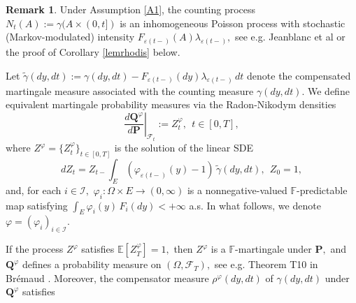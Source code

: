 \documentclass[11pt]{article}
\theoremstyle{plain}
\theoremstyle{definition}
\newtheorem{remark}[theorem]{Remark}
\numberwithin{equation}{section}
\newcommand{\calF}{\mathcal{F}}
\newcommand{\calI}{\mathcal{I}}
\newcommand{\eps}{\varepsilon}
\newcommand{\Exp}{\mathds{E}}
\newcommand{\Prob}{\mathbf{P}}
\newcommand{\Fil}{\mathds{F}}
\newcommand{\Qbf}{\mathbf{Q}}
\begin{document}
\begin{remark}
Under Assumption \ref{A1}, the counting process $N_t(A):=\gamma(A\times (0,t])$ is an inhomogeneous Poisson process with stochastic (Markov-modulated) intensity $F_{\eps(t-)}(A)\lambda_{\eps(t-)},$ see e.g. Jeanblanc et al \cite[Section 8.4.2]{jeanblanc} or the proof of Corollary \ref{lemrhodis} below.
\end{remark}
Let $\widetilde{\gamma}(dy,dt):=\gamma(dy,dt)- F_{\eps(t-)}(dy)\lambda_{\eps(t-)}\,dt$ denote the compensated martingale measure associated with the counting measure $\gamma(dy,dt).$ We define equivalent martingale probability measures via the Radon-Nikodym densities
\[
\left.\frac{d\Qbf^\varphi}{d\Prob}\right|_{\calF_t}:=Z_t^\varphi, \ \ t\in[0,T],
\]
where $Z^\varphi=\{Z_t^\varphi\}_{t\in[0,T]}$ is the solution of the linear SDE
\begin{equation}\label{eq:dZt}
dZ_t=Z_{t-}\int_{E}(\varphi_{\eps(t-)}(y)-1)\,\widetilde{\gamma}(dy,dt), \ \ Z_0=1,
\end{equation}
and, for each $i\in\calI,$ $\varphi_i:\Omega\times E\to (0,\infty)$ is a nonnegative-valued $\Fil$-predictable map satisfying $\int_E\varphi_{i}(y)\,F_{i}(dy)<+\infty$ a.s. In what follows, we denote $\varphi=(\varphi_i)_{i\in\calI}.$

If the process $Z^\varphi$  satisfies $\Exp[Z_T^\varphi]=1,$ then $Z^\varphi$ is a $\Fil$-martingale under $\Prob,$ and $\Qbf^\varphi$ defines a probability measure on $(\Omega,\calF_T),$ see e.g. Theorem T10 in Br\'{e}maud \cite[Chapter VIII]{bremaud}. Moreover, the compensator measure $\rho^\varphi(dy,dt)$ of $\gamma(dy,dt)$ under $\Qbf^\varphi$ satisfies
\end{document}
